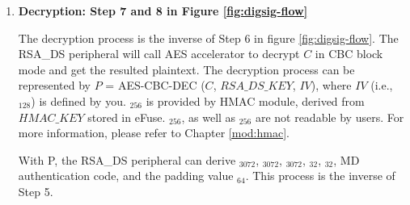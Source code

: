 \documentclass[main\_\_EN.tex]{subfiles}
\begin{document}
\begin{enumerate}  

    \item {\bfseries Decryption: Step 7 and 8 in Figure \ref{fig:digsig-flow}}
    
        
        The decryption process is the inverse of Step 6 in figure \ref{fig:digsig-flow}. The RSA\_DS peripheral will call AES accelerator to decrypt \begin{math}C\end{math} in CBC block mode and get the resulted plaintext. The decryption process can be represented by \begin{math}P\end{math} = AES-CBC-DEC (\begin{math}C\end{math}, \begin{math}RSA\_DS\_KEY\end{math}, \begin{math}IV\end{math}), where \begin{math}IV\end{math} (i.e., \begin{math}[IV]_{128}\end{math}) is defined by you. \begin{math}[RSA\_DS\_KEY]_{256}\end{math} is provided by HMAC module, derived from \begin{math}HMAC\_KEY\end{math} stored in eFuse. \begin{math}[RSA\_DS\_KEY]_{256}\end{math}, as well as \begin{math}[HMAC\_KEY]_{256}\end{math} are not readable by users. For more information, please refer to Chapter \ref{mod:hmac}\textit{}.

        With P, the RSA\_DS peripheral can derive \begin{math}[Y]_{3072}\end{math}, \begin{math}[M]_{3072}\end{math}, \begin{math}[\overline{r}]_{3072}\end{math}, \begin{math}[M^{\prime}]_{32}\end{math}, \begin{math}[L]_{32}\end{math}, MD authentication code, and the padding value \begin{math}[\beta]_{64} \end{math}. This process is the inverse of Step 5.
        

\end{enumerate}
\end{document}
